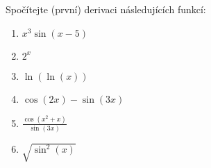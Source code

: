Spočítejte (první) derivaci následujících funkcí:
\begin{enumerate}

	\item  $x^3 \sin(x - 5)$

	\item  $2^x$

	\item  $\ln(\ln(x))$

	\item  $\cos(2x) - \sin(3x)$

	\item  $\frac{\cos(x^2 + x)}{\sin(3x)}$

	\item  $\sqrt{\sin^2(x)}$

\end{enumerate}

